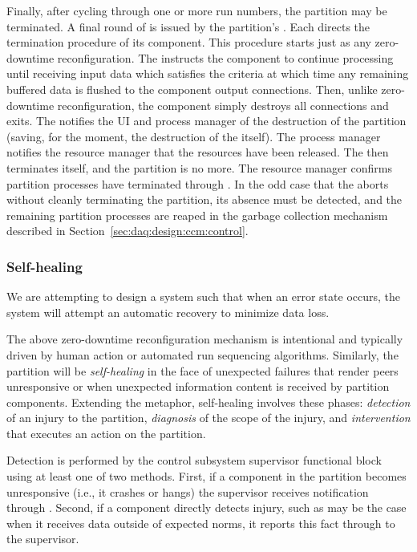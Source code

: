 Finally, after cycling through one or more run numbers, the partition may be terminated. 
A final round of  is issued by the partition's . 
Each  directs the termination procedure of its component. 
This procedure starts just as any zero-downtime reconfiguration. 
The  instructs the component to continue processing until receiving input data which satisfies the  criteria at which time any remaining buffered data is flushed to the component output connections. 
Then, unlike zero-downtime reconfiguration, the component simply destroys all connections and exits. 
The  notifies the UI and process manager of the destruction of the partition (saving, for the moment, the destruction of the  itself). 
The process manager notifies the resource manager that the resources have been released. 
The  then terminates itself, and the partition is no more.
The resource manager confirms partition processes have terminated through . 
In the odd case that the  aborts without cleanly terminating the partition, its absence must be detected, and the remaining partition processes are reaped in the garbage collection mechanism described in Section~\ref{sec:daq:design:ccm:control}.

\subsubsection{Self-healing}
\label{sec:daq:self-healing}

We are attempting to design a system such that when an error state
occurs, the system will attempt an automatic recovery to minimize data
loss.

The above zero-downtime reconfiguration mechanism is intentional and typically driven by human action or automated run sequencing algorithms. 
Similarly, the partition will be \textit{self-healing} in the face of unexpected failures that render peers unresponsive or when unexpected information content is received by partition components.  
Extending the metaphor, self-healing involves these phases: \textit{detection} of an injury to the partition, \textit{diagnosis} of the scope of the injury, and \textit{intervention} that executes an action on the partition.

Detection is performed by the  control subsystem supervisor functional block using at least one of two methods.
First, if a component in the partition becomes unresponsive (i.e., it crashes or hangs) the supervisor  receives notification through  . 
Second, if a component directly detects injury, such as may be the case when it receives  data outside of expected norms, it reports this fact through  to the supervisor.

